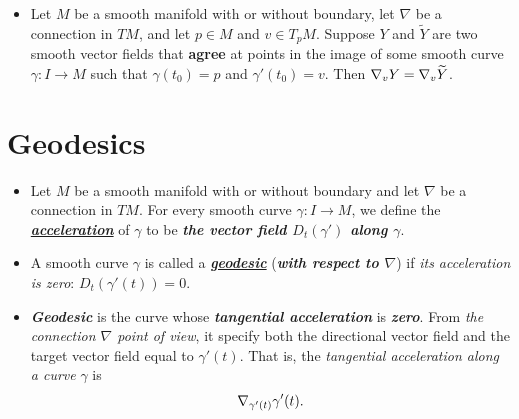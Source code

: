 \documentclass[11pt]{article}
\begin{document}
\begin{itemize}
\item \begin{proposition}
Let $M$ be a smooth manifold with or without boundary, let $\nabla$ be a connection in $TM$, and let $p \in M$ and $v \in T_{p}M$. Suppose $Y$ and $\widetilde{Y}$ are two smooth vector fields that \textbf{agree} at points in the image of some smooth curve $\gamma: I \rightarrow M$ such that  $\gamma(t_0) = p$ and $\gamma'(t_0) = v$. Then $\nabla_{v}{Y} = \nabla_{v}{\widetilde{Y}}$.
\end{proposition}
\end{itemize}

\section{Geodesics}
\begin{itemize}
\item 
\begin{definition}
Let $M$ be a smooth manifold with or without boundary and let $\nabla$ be a connection in $TM$. For every smooth curve $\gamma: I \rightarrow M$, we define the \underline{\emph{\textbf{acceleration}}} of $\gamma$ to be \emph{\textbf{the vector field $D_t(\gamma')$ along $\gamma$}}.
\end{definition}

\item \begin{definition}
A smooth curve $\gamma$ is called a \underline{\emph{\textbf{geodesic}}} (\emph{\textbf{with respect to $\nabla$}}) if \emph{its acceleration is zero}: $D_t(\gamma'(t)) = 0$. 
\end{definition}

\item \begin{remark}
\emph{\textbf{Geodesic}} is the curve whose \emph{\textbf{tangential acceleration}} is \emph{\textbf{zero}}. From \emph{the connection $\nabla$ point of view}, it specify both the directional vector field and the target vector field equal to $\gamma'(t)$. That is, the \emph{tangential acceleration along a curve} $\gamma$ is 
\begin{align*}
\nabla_{\gamma'(t)}{\gamma'(t)}.
\end{align*}
\end{remark}


\end{itemize}
\end{document}

